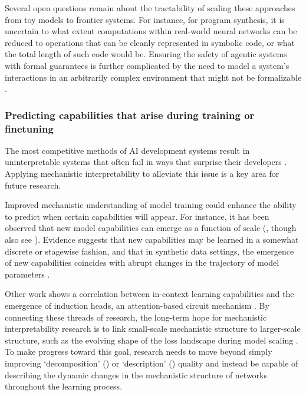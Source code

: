 Several open questions remain about the tractability of scaling these approaches from toy models to frontier systems. For instance, for program synthesis, it is uncertain to what extent computations within real-world neural networks can be reduced to operations that can be cleanly represented in symbolic code, or what the total length of such code would be. Ensuring the safety of agentic systems with formal guarantees is further complicated by the need to model a system's interactions in an arbitrarily complex environment that might not be formalizable \citep{seshia2020verifiedartificialintelligence,Wongpiromsarn_2023,dalrymple2024guaranteedsafeaiframework}.


\subsubsection{Predicting capabilities that arise during training or finetuning}
\label{subsubsec:predicting-capabilities}


The most competitive methods of AI development systems result in uninterpretable systems that often fail in ways that surprise their developers \citep{openai2024gpt4technicalreport, geminiteam2024geminifamilyhighlycapable, Anthropic}. Applying mechanistic interpretability to alleviate this issue is a key area for future research.

Improved mechanistic understanding of model training could enhance the ability to predict when certain capabilities will appear. For instance, it has been observed that new model capabilities can emerge as a function of scale (\citet{wei2022emergentabilitieslargelanguage}, though also see \citet{schaeffer2023emergentabilitieslargelanguage}). Evidence suggests that new capabilities may be learned in a somewhat discrete \citet{michaud2023the} or stagewise \citep{wang2024loss} fashion, and that in synthetic data settings, the emergence of new capabilities coincides with abrupt changes in the trajectory of model parameters \citep{park2024emergencehiddencapabilitiesexploring}.

Other work shows a correlation between in-context learning capabilities and the emergence of induction heads, an attention-based circuit mechanism \citep{olsson2022incontextlearninginductionheads}. By connecting these threads of research, the long-term hope for mechanistic interpretability research is to link small-scale mechanistic structure to larger-scale structure, such as the evolving shape of the loss landscape during model scaling \citep{olah2023interpretability}. To make progress toward this goal, research needs to move beyond simply improving `decomposition' () or `description' () quality and instead be capable of describing the dynamic changes in the mechanistic structure of networks throughout the learning process.

